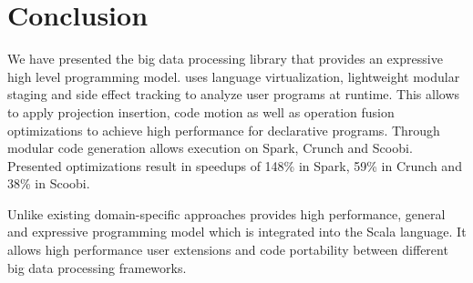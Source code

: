 \section{Conclusion}
\label{sec:conclusion}

We have presented the big data processing library \tool that provides an
expressive high level programming model. \tool uses language virtualization,
lightweight modular staging and side effect tracking to analyze user programs at
runtime. This allows \tool to apply projection insertion, code motion as well as
operation fusion optimizations to achieve high performance for declarative
programs. Through modular code generation \tool allows execution on Spark,
Crunch and Scoobi. Presented optimizations result in speedups of 148\% in Spark,
59\% in Crunch and 38\% in Scoobi.

Unlike existing domain-specific approaches \tool provides high performance,
general and expressive programming model which is integrated into the Scala language. It allows high performance user extensions and code portability between different big data processing frameworks.

